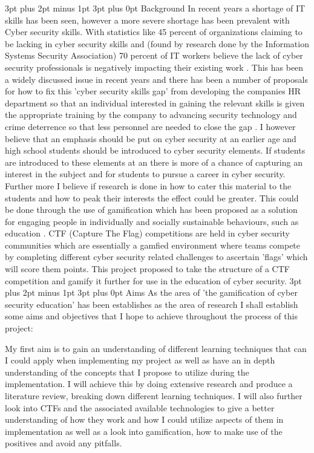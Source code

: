 \documentclass[12pt,a4paper]{article}
\makeatletter
\renewcommand\subsection{\@startsection {subsection}{1}{2mm} %
                               {3pt plus 2pt minus 1pt} %
                               {3pt plus 0pt} %
                               {\normalfont\bfseries}}
\makeatother
\begin{document}
\subsection{Background}  
In recent years a shortage of IT skills has been seen, however a more severe shortage has been prevalent with Cyber security skills. With statistics like 45 percent of organizations claiming to be lacking in cyber security skills and (found by research done by the Information Systems Security Association) 70 percent of IT workers believe the lack of cyber security professionals is negatively impacting their existing work \cite{smith2018intelligent}. This has been a widely discussed issue in recent years and there has been a number of proposals for how to fix this 'cyber security skills gap' from developing the companies HR department so that an individual interested in gaining the relevant skills is given the appropriate training by the company to advancing security technology and crime deterrence so that less personnel are needed to close the gap \cite{cobb2016mind}. I however believe that an emphasis should be put on cyber security at an earlier age and high school students should be introduced to cyber security elements. If students are introduced to these elements at an there is more of a chance of capturing an interest in the subject and for  students to pursue a career in cyber security. Further more I believe if research is done in how to cater this material to the students and how to peak their interests the effect could be greater. This could be done through the use of gamification which has been proposed as a solution for engaging people in individually and socially sustainable behaviours, such as education \cite{su2015mobile}. CTF (Capture The Flag) competitions are held in cyber security communities which are essentially a gamfied environment where teams compete by completing different cyber security related challenges to ascertain 'flags' which will score them points. This project proposed to take the structure of a CTF competition and gamify it further for use in the education of cyber security.  
\subsection{Aims} 
As the area of 'the gamification of cyber security education' has been establishes as the area of research I shall establish some aims and objectives that I hope to achieve throughout the process of this project:  


My first aim is to gain an understanding of different learning techniques that can I could apply when implementing my project as well as have an in depth understanding of the concepts that I propose to utilize during the implementation. I will achieve this by doing extensive research and produce a literature review, breaking down different learning techniques. I will also further look into CTFs and the associated available technologies to give a better understanding of how they work and how I could utilize aspects of them in implementation as well as a look into gamification, how to make use of the positives and avoid any pitfalls.  
\end{document}
